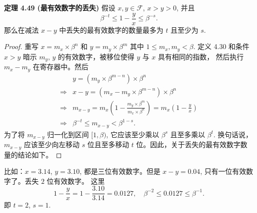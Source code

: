 \documentclass[a4paper]{ctexart}
\begin{document}
{%





\noindent \textbf{定理 4.49 (最有效数字的丢失) } 假设 $x, y \in \mathcal{F}$, $x > y > 0$, 并且
\[
  \beta^{-t} \leq 1 - \frac{y}{x} \leq \beta^{-s}. \tag{4.26}
\]
那么在减法 $x - y$ 中丢失的最有效数字的数量最多为 $t$ 且至少为 $s$.

\begin{proof}
重写 $x = m_x \times \beta^n$ 和 $y = m_y \times \beta^m$ 其中 $1 \leq m_x, m_y < \beta$. 
定义 4.30 和条件 $x > y$ 暗示 $m_y$, $y$ 的有效数字，被移位使得 $y$ 与 $x$ 具有相同的指数，
然后执行 $m_x - m_y$ 在寄存器中。然后
\begin{align*}
  &y = (m_y \times \beta^{m-n}) \times \beta^n \\
  \Rightarrow & x - y  = (m_x - m_y \times \beta^{m-n}) \times \beta^n\\
  \Rightarrow & m_{x-y} = m_x \left(1 - \frac{m_y \times \beta^m}{m_x \times \beta^n}\right)  = m_x \left(1 - \frac{y}{x}\right) \\
  \Rightarrow & \beta^{-t} \leq m_{x-y} < \beta^{1-s}.
\end{align*}
为了将 $m_{x-y}$ 归一化到区间 $[1, \beta)$, 它应该至少乘以 $\beta^s$ 且至多乘以 $\beta^t$. 
换句话说，$m_{x-y}$ 应该至少向左移动 $s$ 位且至多移动 $t$ 位。因此，关于丢失的最有效数字数量的结论如下。
\end{proof}

比如：$x = 3.14$, $y = 3.10$, 都是三位有效数字。但是 $x - y = 0.04$, 只有一位有效数字了。丢失 $2$ 位有效数字。
这里 
$$
1 - \frac{y}{x} = 1 - \frac{3.10}{3.14} = 0.0127, \quad \beta^{-2} \leq 0.0127 \leq \beta^{-1}.
$$
即 $t = 2$, $s = 1$.

}
\end{document}

